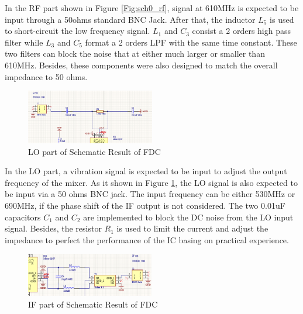 \documentclass[12pt, a4paper]{report}
\begin{document}
\newpage

In the RF part shown in Figure \ref{Fig:sch0_rf}, signal at 610MHz is expected to be input through a 50ohms standard BNC Jack. After that, the inductor $L_{5}$ is used to short-circuit the low frequency signal. $L_{1}$ and $C_{3}$ consist a 2 orders high pass filter while $L_{3}$ and $C_{5}$ format a 2 orders LPF with the same time constant. These two filters can block the noise that at either much larger or smaller than 610MHz. Besides, these components were also designed to match the overall impedance to 50 ohms.

\begin{figure}[htbp]     \begin{centering}
    \includegraphics[width=0.5\textwidth]{img/sch0_lo.png}
    \caption{\label{Fig:sch0_lo}LO part of Schematic Result of FDC}
    \end{centering}
    
\end{figure}

In the LO part, a vibration signal is expected to be input to adjust the output frequency of the mixer. As it shown in Figure \ref{Fig:sch0_lo}, the LO signal is also expected to be input via a 50 ohms BNC jack. The input frequency can be either 530MHz or 690MHz, if the phase shift of the IF output is not considered. The two 0.01uF capacitors $C_{1}$ and $C_{2}$ are implemented to block the DC noise from the LO input signal. Besides, the resistor $R_{1}$ is used to limit the current and adjust the impedance to perfect the performance of the IC basing on practical experience.

\begin{figure}[htbp]     \begin{centering}
    \includegraphics[width=0.5\textwidth]{img/sch0_if.png}
    \caption{\label{Fig:sch0_if}IF part of Schematic Result of FDC}
    \end{centering}
    
\end{figure}
\end{document}
